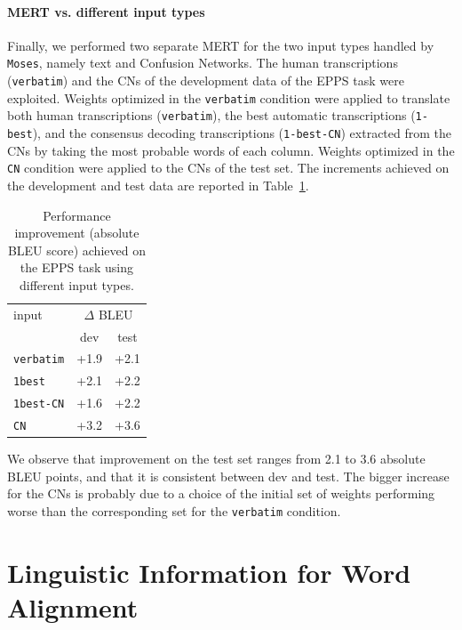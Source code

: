 \documentclass[11pt]{report}
\theoremstyle{plain}
\begin{document}
{\paragraph{MERT vs. different input types} Finally, we performed two separate MERT for the two input types handled by {\tt Moses}, namely text and Confusion Networks. The human transcriptions ({\tt verbatim}) and the CNs of the development data of the EPPS task were exploited. Weights optimized in the {\tt verbatim} condition were applied to translate both human transcriptions ({\tt verbatim}), the best automatic transcriptions ({\tt 1-best}),  and the consensus decoding transcriptions ({\tt 1-best-CN}) extracted from the CNs \cite{mangu:00} by taking the most probable words of  each column. Weights optimized in the {\tt CN} condition were applied to the CNs of the test set.
The increments achieved on the development and test data are reported in Table~\ref{tbl:MERT-epps-summary}.


 \begin{table}[ht]
\begin{center}
\label{tbl:MERT-epps-summary}
\begin{tabular}{l|cc}
input                    &\multicolumn{2}{c}{$\Delta$ BLEU}\\
                             & dev & test\\
\hline
{\tt verbatim}  &  +1.9 & +2.1\\
{\tt 1best}        &  +2.1 & +2.2\\
{\tt 1best-CN} &  +1.6 & +2.2\\
\hline
{\tt CN}            &  +3.2 & +3.6\\
\end{tabular}
\caption{Performance improvement  (absolute BLEU score) achieved on the EPPS task using different input types.}
\end{center}
\end{table}

We observe that improvement on the test set ranges from 2.1 to 3.6 absolute BLEU points, and that it is consistent between dev and test. The bigger increase for the CNs is probably due to a choice of the initial set of weights performing worse than the corresponding set for the {\tt verbatim} condition.


\section{Linguistic Information for Word Alignment}

}
\end{document}
